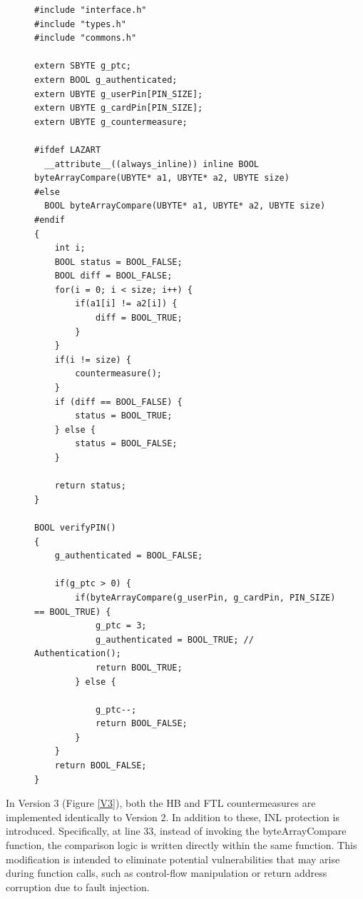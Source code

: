 \begin{figure}
\begin{lstlisting}[caption={code.c of VerifyPin function in benchmark V2}, label={V2}, basicstyle=\ttfamily\footnotesize]
#include "interface.h"
#include "types.h"
#include "commons.h"

extern SBYTE g_ptc;
extern BOOL g_authenticated;
extern UBYTE g_userPin[PIN_SIZE];
extern UBYTE g_cardPin[PIN_SIZE];
extern UBYTE g_countermeasure;

#ifdef LAZART
  __attribute__((always_inline)) inline BOOL byteArrayCompare(UBYTE* a1, UBYTE* a2, UBYTE size)
#else
  BOOL byteArrayCompare(UBYTE* a1, UBYTE* a2, UBYTE size)
#endif
{
    int i;
    BOOL status = BOOL_FALSE;
    BOOL diff = BOOL_FALSE;
    for(i = 0; i < size; i++) {
        if(a1[i] != a2[i]) {
            diff = BOOL_TRUE;
        }
    }
    if(i != size) {
        countermeasure();
    }
    if (diff == BOOL_FALSE) {
        status = BOOL_TRUE;
    } else {
        status = BOOL_FALSE;
    }

    return status;
}

BOOL verifyPIN()
{
    g_authenticated = BOOL_FALSE;

    if(g_ptc > 0) {
        if(byteArrayCompare(g_userPin, g_cardPin, PIN_SIZE) == BOOL_TRUE) {
            g_ptc = 3;
            g_authenticated = BOOL_TRUE; // Authentication();
            return BOOL_TRUE;
        } else {

            g_ptc--;
            return BOOL_FALSE;
        }
    }
    return BOOL_FALSE;
}
\end{lstlisting}
\end{figure}

In Version 3 (Figure \ref{V3}), both the HB and FTL countermeasures are implemented identically to Version 2. In addition to these, INL protection is introduced. Specifically, at line 33, instead of invoking the byteArrayCompare function, the comparison logic is written directly within the same function. This modification is intended to eliminate potential vulnerabilities that may arise during function calls, such as control-flow manipulation or return address corruption due to fault injection.

